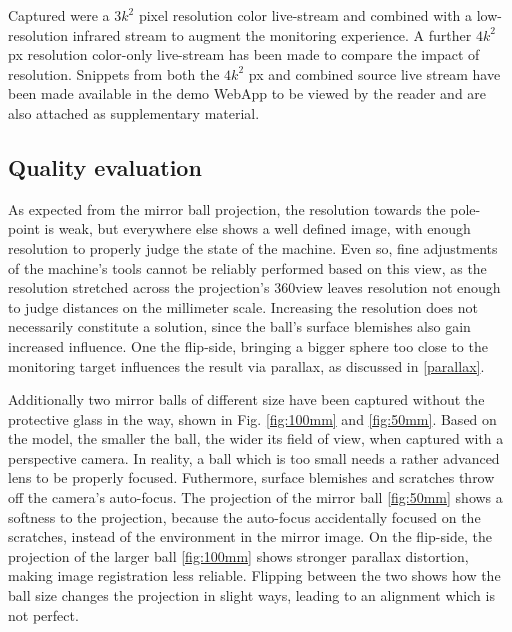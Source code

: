 \documentclass[10pt]{article}
\begin{document}
\begin{multicols}{2}
	Captured were a $3k^2$ pixel resolution color live-stream and combined with a low-resolution infrared stream to augment the monitoring experience. A further $4k^2$ px resolution color-only live-stream has been made to compare the impact of resolution. Snippets from both the $4k^2$ px and combined source live stream have been made available in the demo WebApp to be viewed by the reader and are also attached as supplementary material.

	\subsection{Quality evaluation}
	As expected from the mirror ball projection, the resolution towards the pole-point is weak, but everywhere else shows a well defined image, with enough resolution to properly judge the state of the machine. Even so, fine adjustments of the machine's tools cannot be reliably performed based on this view, as the resolution stretched across the projection's 360\degree  view leaves resolution not enough to judge distances on the millimeter scale. Increasing the resolution does not necessarily constitute a solution, since the ball's surface blemishes also gain increased influence. One the flip-side, bringing a bigger sphere too close to the monitoring target influences the result via parallax, as discussed in \ref{parallax}.
	
	Additionally two mirror balls of different size have been captured without the protective glass in the way, shown in Fig. \ref{fig:100mm} and \ref{fig:50mm}. Based on the model, the smaller the ball, the wider its field of view, when captured with a perspective camera. In reality, a ball which is too small needs a rather advanced lens to be properly focused. Futhermore, surface blemishes and scratches throw off the camera's auto-focus. The projection of the mirror ball \ref{fig:50mm} shows a softness to the projection, because the auto-focus accidentally focused on the scratches, instead of the environment in the  mirror image. On the flip-side, the projection of the larger ball \ref{fig:100mm} shows stronger parallax distortion, making image registration less reliable. Flipping between the two shows how the ball size changes the projection in slight ways, leading to an alignment which is not perfect.


\end{multicols}
\end{document}
